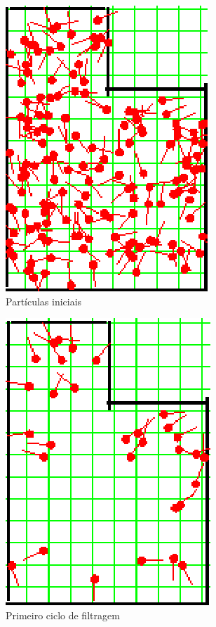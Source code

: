\begin{figure}[H]
  \centering
  \includegraphics[scale=1]{figuras/cen4_ex2/1.eps}
  \caption[Partículas Iniciais]{Partículas iniciais}
  \label{img:cen4_ex2_1}
\end{figure}

\begin{figure}[H]
  \centering
  \includegraphics[scale=1]{figuras/cen4_ex2/2.eps}
  \caption[Primeiro Ciclo de Filtragem]{Primeiro ciclo de filtragem}
  \label{img:cen4_ex2_2}
\end{figure}

